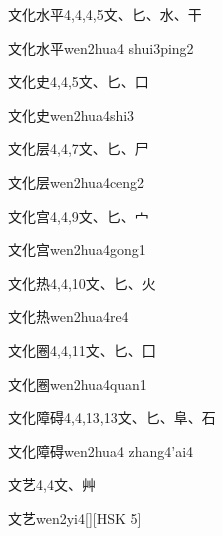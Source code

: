 \begin{Entry}{文化水平}{4,4,4,5}{⽂、⼔、⽔、⼲}
  \begin{Phonetics}{文化水平}{wen2hua4 shui3ping2}
  \end{Phonetics}
\end{Entry}

\begin{Entry}{文化史}{4,4,5}{⽂、⼔、⼝}
  \begin{Phonetics}{文化史}{wen2hua4shi3}
  \end{Phonetics}
\end{Entry}

\begin{Entry}{文化层}{4,4,7}{⽂、⼔、⼫}
  \begin{Phonetics}{文化层}{wen2hua4ceng2}
  \end{Phonetics}
\end{Entry}

\begin{Entry}{文化宫}{4,4,9}{⽂、⼔、⼧}
  \begin{Phonetics}{文化宫}{wen2hua4gong1}
  \end{Phonetics}
\end{Entry}

\begin{Entry}{文化热}{4,4,10}{⽂、⼔、⽕}
  \begin{Phonetics}{文化热}{wen2hua4re4}
  \end{Phonetics}
\end{Entry}

\begin{Entry}{文化圈}{4,4,11}{⽂、⼔、⼞}
  \begin{Phonetics}{文化圈}{wen2hua4quan1}
  \end{Phonetics}
\end{Entry}

\begin{Entry}{文化障碍}{4,4,13,13}{⽂、⼔、⾩、⽯}
  \begin{Phonetics}{文化障碍}{wen2hua4 zhang4'ai4}
  \end{Phonetics}
\end{Entry}

\begin{Entry}{文艺}{4,4}{⽂、⾋}
  \begin{Phonetics}{文艺}{wen2yi4}[][HSK 5]
  \end{Phonetics}
\end{Entry}

